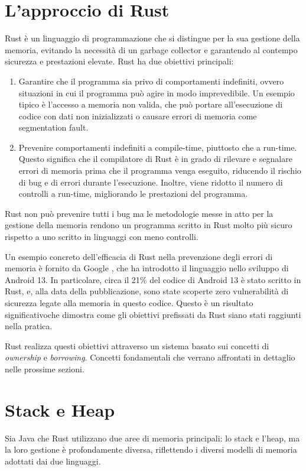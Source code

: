 \section{L'approccio di Rust}
Rust è un linguaggio di programmazione che si distingue per la sua gestione della memoria, evitando la necessità di un garbage collector e garantendo al contempo sicurezza e prestazioni elevate. Rust ha due obiettivi principali:
\begin{enumerate}
    \item  Garantire che il programma sia privo di comportamenti indefiniti, ovvero situazioni in cui il programma può agire in modo imprevedibile. Un esempio tipico è l'accesso a memoria non valida, che può portare all'esecuzione di codice con dati non inizializzati o causare errori di memoria come segmentation fault. 
    \item Prevenire comportamenti indefiniti a compile-time, piuttosto che a run-time. Questo significa che il compilatore di Rust è in grado di rilevare e segnalare errori di memoria prima che il programma venga eseguito, riducendo il rischio di bug e di errori durante l'esecuzione. Inoltre, viene ridotto il numero di controlli a run-time, migliorando le prestazioni del programma. 
\end{enumerate}
Rust non può prevenire tutti i bug ma le metodologie messe in atto per la gestione della memoria rendono un programma scritto in Rust molto più sicuro rispetto a uno scritto in linguaggi con meno controlli. 

Un esempio concreto dell'efficacia di Rust nella prevenzione degli errori di memoria è fornito da Google \cite{android13-memorysafe}, che ha introdotto il linguaggio nello sviluppo di Android 13. In particolare, circa il 21\% del codice di Android 13 è stato scritto in Rust, e, alla data della pubblicazione, sono state scoperte zero vulnerabilità di sicurezza legate alla memoria in questo codice. Questo è un risultato significativoche dimostra come gli obiettivi prefissati da Rust siano stati raggiunti nella pratica.

Rust realizza questi obiettivi attraverso un sistema basato sui concetti di \textit{ownership} e \textit{borrowing}. Concetti fondamentali che verrano affrontati in dettaglio nelle prossime sezioni.

\section{Stack e Heap}
Sia Java che Rust utilizzano due aree di memoria principali: lo stack e l'heap, ma la loro gestione è profondamente diversa, riflettendo i diversi modelli di memoria adottati dai due linguaggi.

